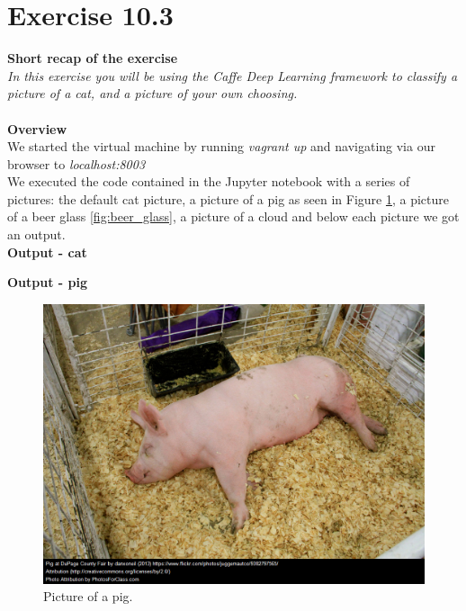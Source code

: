 \documentclass{article}
\begin{document}
\section{Exercise 10.3}
\textbf{Short recap of the exercise}\\
\textit{In this exercise you will be using the Caffe Deep Learning framework to classify a picture of a cat, and a picture of your own choosing.}\\
~\\
\textbf{Overview}\\
We started the virtual machine by running \textit{vagrant up} and navigating via our browser to \textit{localhost:8003}\\
We executed the code contained in the Jupyter notebook with a series of pictures: the default cat picture, a picture of a pig as seen in Figure \ref{fig:pig}, a picture of a beer glass \ref{fig:beer_glass}, a picture of a cloud and below each picture we got an output.
~\\
\textbf{Output - cat}\\
\textbf{Output - pig}
\begin{figure}[h!]
\begin{center}
\caption{Picture of a pig.}
\label{fig:pig}
\includegraphics[scale=0.5]{"../Lesson 10/images/pig"}
\end{center}
\end{figure}
\end{document}
